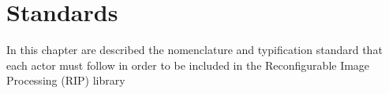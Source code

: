 \chapter{Standards}
In this chapter are described the nomenclature and typification standard that each actor must follow in order to be included in the Reconfigurable Image Processing (RIP) library




